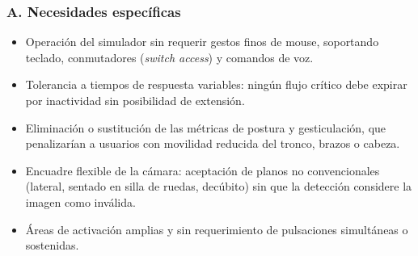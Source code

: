 \subsubsection*{A. Necesidades específicas}
\begin{itemize}
  \item Operación del simulador sin requerir gestos finos de mouse,
        soportando teclado, conmutadores (\textit{switch access}) y
        comandos de voz.
  \item Tolerancia a tiempos de respuesta variables: ningún flujo
        crítico debe expirar por inactividad sin posibilidad de
        extensión.
  \item Eliminación o sustitución de las métricas de postura y
        gesticulación, que penalizarían a usuarios con movilidad
        reducida del tronco, brazos o cabeza.
  \item Encuadre flexible de la cámara: aceptación de planos no
        convencionales (lateral, sentado en silla de ruedas, decúbito)
        sin que la detección considere la imagen como inválida.
  \item Áreas de activación amplias y sin requerimiento de pulsaciones
        simultáneas o sostenidas.
\end{itemize}

